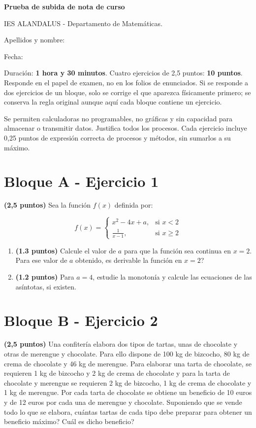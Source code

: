 \documentclass[11pt]{article}
\begin{document}
{\Large\bfseries Prueba de subida de nota de curso}

IES ALANDALUS - Departamento de Matemáticas.

Apellidos y nombre: \hrulefill

Fecha: \hrulefill

Duración: \textbf{1 hora y 30 minutos}. Cuatro ejercicios de 2,5 puntos: \textbf{10 puntos}. Responde en el papel de examen, no en los folios de enunciados. Si se responde a dos ejercicios de un bloque, solo se corrige el que aparezca físicamente primero; se conserva la regla original aunque aquí cada bloque contiene un ejercicio.

Se permiten calculadoras no programables, no gráficas y sin capacidad para almacenar o transmitir datos. Justifica todos los procesos. Cada ejercicio incluye 0,25 puntos de expresión correcta de procesos y métodos, sin sumarlos a su máximo.
\section*{Bloque A - Ejercicio 1}
 \textbf{(2,5 puntos)} Sea la función \( f(x) \) definida por:

\[
f(x) =
\begin{cases} 
x^2 - 4x + a, & \text{si } x < 2 \\[8pt]
\displaystyle \frac{1}{x - 1}, & \text{si } x \geq 2
\end{cases}
\]

\begin{enumerate}
    \item[\textbf{a)}] \textbf{(1.3 puntos)} Calcule el valor de \( a \) para que la función sea continua en \( x = 2 \). Para ese valor de \( a \) obtenido, \textquestiondown{}es derivable la función en \( x = 2 \)?
    \item[\textbf{b)}] \textbf{(1.2 puntos)} Para \( a = 4 \), estudie la monotonía y calcule las ecuaciones de las asíntotas, si existen.
\end{enumerate}
\clearpage
\section*{Bloque B - Ejercicio 2}
 \textbf{(2,5 puntos)} Una confitería elabora dos tipos de tartas, unas de chocolate y otras de merengue y chocolate. Para ello dispone de 100 kg de bizcocho, 80 kg de crema de chocolate y 46 kg de merengue. Para elaborar una tarta de chocolate, se requieren 1 kg de bizcocho y 2 kg de crema de chocolate y para la tarta de chocolate y merengue se requieren 2 kg de bizcocho, 1 kg de crema de chocolate y 1 kg de merengue. Por cada tarta de chocolate se obtiene un beneficio de 10 euros y de 12 euros por cada una de merengue y chocolate. Suponiendo que se vende todo lo que se elabora, \textquestiondown{}cuántas tartas de cada tipo debe preparar para obtener un beneficio máximo? \textquestiondown{}Cuál es dicho beneficio?
\end{document}
